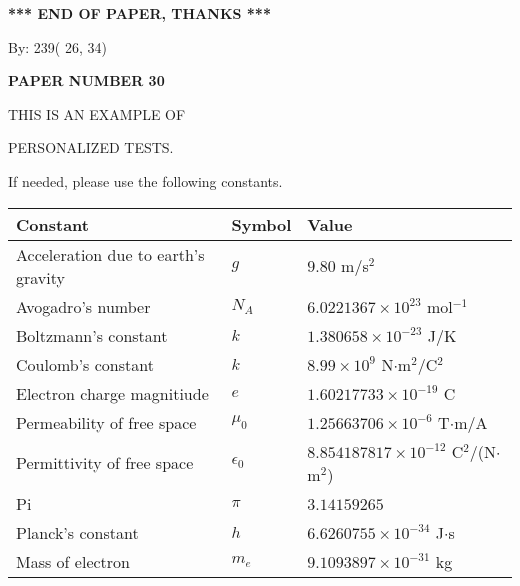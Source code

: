 \documentclass[12pt]{article}
\begin{document}
   
   
   
   
\vspace{1.0in} 
{\textbf{\large{ *** END OF PAPER, THANKS *** }}} 
   
   
\hspace{1.0in} By: 
         239(         26,          34)
   
   
   
   
\newpage 
\setcounter{page}{ 
    30001 } 
   
   
   
   
 {\textbf{ \Large{ PAPER NUMBER          30 }}}
   
   
\vspace{0.2in}
   
   
   
   
   
   
 \vspace{0.2in}
 
 
{\Huge  THIS IS AN EXAMPLE OF}
 
{\Huge  PERSONALIZED TESTS. }
 
If needed, please use the following constants.
 
 
 
\noindent\begin{tabular}{|l|l|l|}
\hline
Constant & Symbol & Value \\
\hline
Acceleration due to earth's gravity &
$g$ &
 $ 9.80 $
m/s$^2$ \\
\hline
Avogadro's number &
$N_A$ &
 $ 6.0221367 \times 10^{23} $
mol$^{-1}$ \\
\hline
Boltzmann's constant &
$k$ &
 $ 1.380658 \times 10^{-23} $
J/K \\
\hline
Coulomb's constant &
$k$ &
 $ 8.99 \times 10^{9} $
N$\cdot $m$^2$/C$^2$ \\
\hline
Electron charge magnitiude &
$e$ &
 $ 1.60217733 \times 10^{-19} $
C \\
\hline
Permeability of free space &
$\mu _0$ &
 $ 1.25663706 \times 10^{-6} $
T$\cdot $m/A \\
\hline
Permittivity of free space &
$\epsilon _0$ &
 $ 8.854187817 \times 10^{-12} $
C$^2$/(N$\cdot $m$^2$) \\
\hline
Pi &
$\pi$ &
 $ 3.14159265 $
$ $ \\
\hline
Planck's constant &
$h$ &
 $ 6.6260755 \times 10^{-34} $
J$\cdot $s \\
\hline
Mass of electron &
$m_e$ &
 $ 9.1093897 \times 10^{-31} $
kg \\
\hline
\end{tabular}
 
\end{document}
